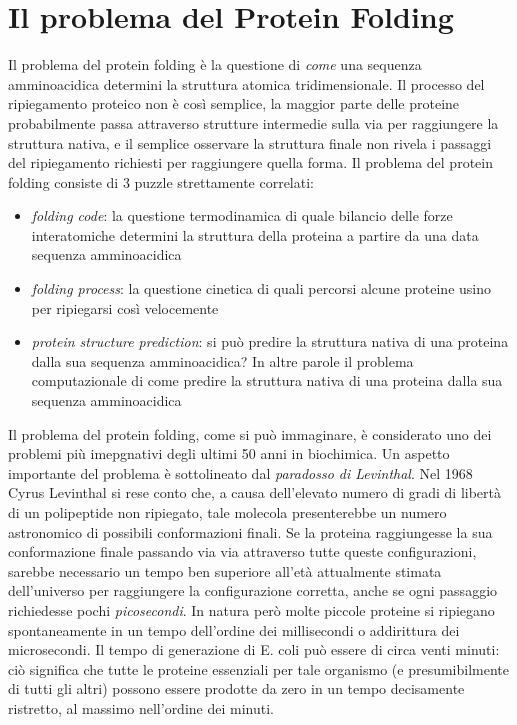 \section{Il problema del Protein Folding} \label{sec:problema-protein-folding}
{
Il problema del protein folding è la questione di \textit{come} una sequenza amminoacidica determini la struttura atomica tridimensionale. Il processo del ripiegamento proteico non è così semplice, la maggior parte delle proteine probabilmente passa attraverso strutture intermedie sulla via per raggiungere la struttura nativa, e il semplice osservare la struttura finale non rivela i passaggi del ripiegamento richiesti per raggiungere quella forma. Il problema del protein folding consiste di 3 puzzle strettamente correlati\supercite{dill2008protein}:
\begin{itemize}
	\item \textit{folding code}: la questione termodinamica di quale bilancio delle forze interatomiche determini la struttura della proteina a partire da una data sequenza amminoacidica
	
	\item \textit{folding process}: la questione cinetica di quali percorsi alcune proteine usino per ripiegarsi così velocemente
	
	\item\textit{protein structure prediction}: si può predire la struttura nativa di una proteina dalla sua sequenza amminoacidica? In altre parole il problema computazionale di come predire la struttura nativa di una proteina dalla sua sequenza amminoacidica
	
\end{itemize}	

Il problema del protein folding, come si può immaginare, è considerato uno dei problemi più imepgnativi degli ultimi 50 anni in biochimica. Un aspetto importante del problema è sottolineato dal \textit{paradosso di Levinthal}. Nel 1968 Cyrus Levinthal si rese conto che, a causa dell'elevato numero di gradi di libertà di un polipeptide non ripiegato, tale molecola presenterebbe un numero astronomico di possibili conformazioni finali. Se la proteina raggiungesse la sua conformazione finale passando via via attraverso tutte queste configurazioni, sarebbe necessario un tempo ben superiore all'età attualmente stimata dell'universo per raggiungere la configurazione corretta, anche se ogni passaggio richiedesse pochi \textit{picosecondi}. In natura però molte piccole proteine si ripiegano spontaneamente in un tempo dell'ordine dei millisecondi o addirittura dei microsecondi. Il tempo di generazione di E. coli può essere di circa venti minuti: ciò significa che tutte le proteine essenziali per tale organismo (e presumibilmente di tutti gli altri) possono essere prodotte da zero in un tempo decisamente ristretto, al massimo nell'ordine dei minuti.

}

